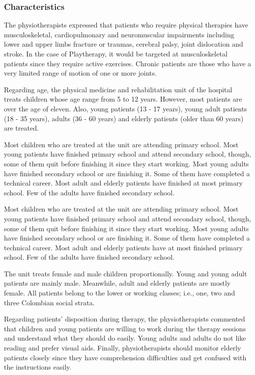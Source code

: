 \subsubsection{Characteristics}
The physiotherapists expressed that patients who require physical therapies have musculoskeletal, cardiopulmonary and neuromuscular impairments including lower and upper limbs fracture or traumas, cerebral palsy, joint dislocation and stroke. In the case of Playtherapy, it would be targeted at musculoskeletal patients since they require active exercises. Chronic patients are those who have a very limited range of motion of one or more joints.

Regarding age, the physical medicine and rehabilitation unit of the hospital treats children whose age range from 5 to 12 years. However, most patients are over the age of eleven. Also, young patients (13 - 17 years), young adult patients (18 - 35 years), adults (36 - 60 years) and elderly patients (older than 60 years) are treated.

Most children who are treated at the unit are attending primary school. Most young patients have finished primary school and attend secondary school, though, some of them quit before finishing it since they start working. Most young adults have finished secondary school or are finishing it. Some of them have completed a technical career. Most adult and elderly patients have finished at most primary school. Few of the adults have finished secondary school.

Most children who are treated at the unit are attending primary school. Most young patients have finished primary school and attend secondary school, though, some of them quit before finishing it since they start working. Most young adults have finished secondary school or are finishing it. Some of them have completed a technical career. Most adult and elderly patients have at most finished primary school. Few of the adults have finished secondary school.

The unit treats female and male children proportionally. Young and young adult patients are mainly male. Meanwhile, adult and elderly patients are mostly female. All patients belong to the lower or working classes; i.e., one, two and three Colombian social strata.

Regarding patients' disposition during therapy, the physiotherapists commented that children and young patients are willing to work during the therapy sessions and understand what they should do easily. Young adults and adults do not like reading and prefer visual aids. Finally, physiotherapists should monitor elderly patients closely since they have comprehension difficulties and get confused with the instructions easily.

